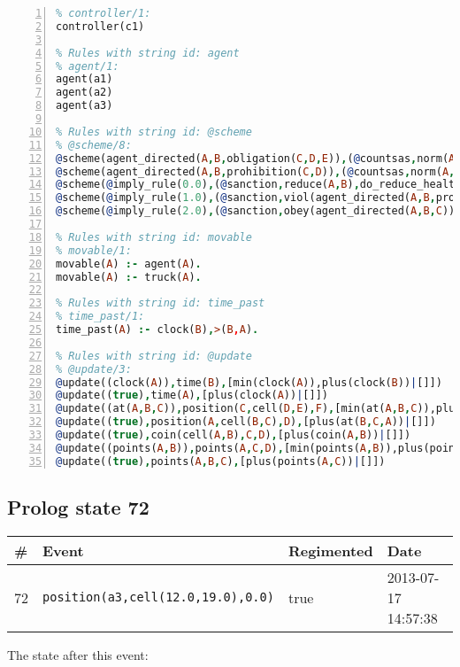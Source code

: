 \documentclass[11pt]{article}\usepackage[utf8]{inputenc}\usepackage{geometry}
\begin{document}
\begin{lstlisting}[language=Prolog, numbers=left]
% Rules with string id: controller
% controller/1:
controller(c1)

% Rules with string id: agent
% agent/1:
agent(a1)
agent(a2)
agent(a3)

% Rules with string id: @scheme
% @scheme/8:
@scheme(agent_directed(A,B,obligation(C,D,E)),(@countsas,norm(A,B,F,obligation(C,D,E)),F),false,(listTrue(C)),(time_past(D)),false,[plus(viol(agent_directed(A,B,obligation(C,D,E))))|[]],[plus(obey(agent_directed(A,B,obligation(C,D,E))))|[]])
@scheme(agent_directed(A,B,prohibition(C,D)),(@countsas,norm(A,B,E,prohibition(C,D)),E),(listTrue(C)),false,(false),false,[plus(viol(agent_directed(A,B,prohibition(C,D))))|[]],[plus(obey(agent_directed(A,B,prohibition(C,D))))|[]])
@scheme(@imply_rule(0.0),(@sanction,reduce(A,B),do_reduce_health(A,B),notifyAgent(A,changed(status))),true,false,false,false,[min(reduce(A,B))|[]],[])
@scheme(@imply_rule(1.0),(@sanction,viol(agent_directed(A,B,prohibition(C,D))),do_sanction(D)),true,false,false,false,[min(viol(agent_directed(A,B,prohibition(C,D))))|[]],[])
@scheme(@imply_rule(2.0),(@sanction,obey(agent_directed(A,B,C))),true,false,false,false,[min(obey(agent_directed(A,B,C)))|[]],[])

% Rules with string id: movable
% movable/1:
movable(A) :- agent(A).
movable(A) :- truck(A).

% Rules with string id: time_past
% time_past/1:
time_past(A) :- clock(B),>(B,A).

% Rules with string id: @update
% @update/3:
@update((clock(A)),time(B),[min(clock(A)),plus(clock(B))|[]])
@update((true),time(A),[plus(clock(A))|[]])
@update((at(A,B,C)),position(C,cell(D,E),F),[min(at(A,B,C)),plus(at(D,E,C))|[]])
@update((true),position(A,cell(B,C),D),[plus(at(B,C,A))|[]])
@update((true),coin(cell(A,B),C,D),[plus(coin(A,B))|[]])
@update((points(A,B)),points(A,C,D),[min(points(A,B)),plus(points(A,D))|[]])
@update((true),points(A,B,C),[plus(points(A,C))|[]])

\end{lstlisting}
\clearpage 
\subsection{Prolog state 72}
\begin{table}[ht]
\centering 
\begin{tabular}{l l l l} 
\textbf{\#} & \textbf{Event} & \textbf{Regimented} & \textbf{Date} \\ [0.5ex] 
\hline
72&\texttt{position(a3,cell(12.0,19.0),0.0)}&true&2013-07-17 14:57:38\\ [1ex] \hline\end{tabular}
\end{table}
The state after this event:
\end{document}
